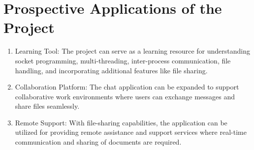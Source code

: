 \documentclass[11pt]{article}
\begin{document}
\section{Prospective Applications of the Project}
\begin{enumerate}
    \item Learning Tool: The project can serve as a learning resource for understanding socket programming, multi-threading, inter-process communication, file handling, and incorporating additional features like file sharing.
    \item Collaboration Platform: The chat application can be expanded to support collaborative work environments where users can exchange messages and share files seamlessly.
    \item Remote Support: With file-sharing capabilities, the application can be utilized for providing remote assistance and support services where real-time communication and sharing of documents are required.
\end{enumerate}
\end{document}
